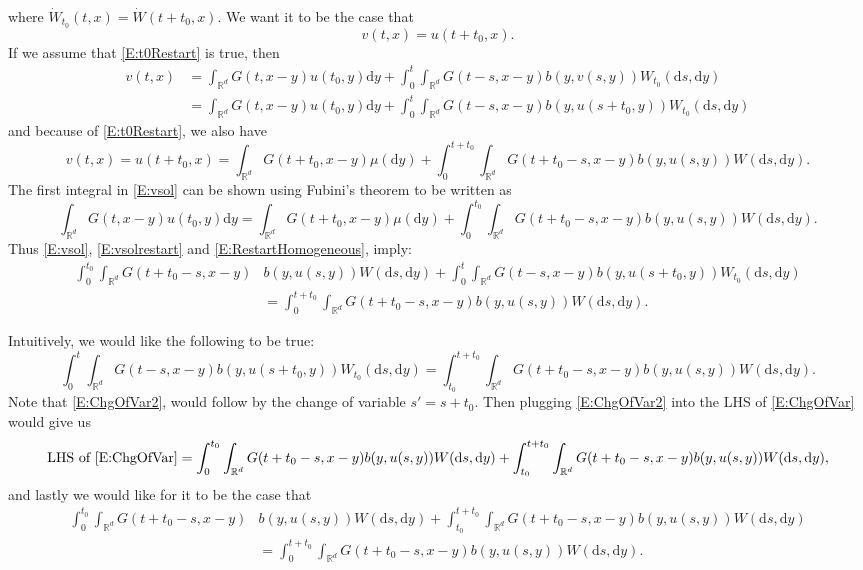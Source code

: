 \documentclass{article}
\numberwithin{equation}{section}
\newcommand{\R}{\mathbb{R}}
\newcommand{\ud}{\ensuremath{\mathrm{d}}}
\begin{document}
where $\dot{W}_{t_0}(t,x) = \dot{W}(t+t_0,x)$. We want it to be the case that
	\begin{equation} \label{E:t0Restart}
		v(t,x) = u(t+t_0,x).
	\end{equation}
If we assume that \eqref{E:t0Restart} is true, then
	\begin{align}
		v(t,x) &= \int_{\R^d} G(t,x-y) u(t_0,y) \ud y + \int_0^t \int_{\R^d} G(t-s,x-y) b(y,v(s,y)) W_{t_0}(\ud s, \ud y) \nonumber \\
		&= \int_{\R^d} G(t,x-y) u(t_0,y) \ud y + \int_0^t \int_{\R^d} G(t-s,x-y) b(y,u(s+t_0,y)) W_{t_0}(\ud s, \ud y) \label{E:vsol}
	\end{align}
and because of \eqref{E:t0Restart}, we also have
	\begin{equation}
	\label{E:vsolrestart}
		v(t,x) = u(t+t_0,x) = \int_{\R^d} G(t+t_0,x-y) \mu(\ud y) + \int_0^{t+t_0} \int_{\R^d} G(t+t_0-s,x-y) b(y,u(s,y)) W(\ud s, \ud y).
	\end{equation}
The first integral in \eqref{E:vsol} can be shown using Fubini's theorem to be written as
	\begin{equation} \label{E:RestartHomogeneous}
		\int_{\R^d} G(t,x-y) u(t_0,y) \ud y = \int_{\R^d} G(t+t_0,x-y) \mu(\ud y) + \int_0^{t_0}\int_{\R^d} G(t+t_0-s, x-y)b(y,u(s,y)) W(\ud s, \ud y).
	\end{equation}
Thus \eqref{E:vsol}, \eqref{E:vsolrestart} and \eqref{E:RestartHomogeneous}, imply:
	\begin{align}
		\int_0^{t_0}\int_{\R^d} G(t+t_0-s, x-y) & b(y,u(s,y)) W(\ud s, \ud y) + \int_0^t \int_{\R^d} G(t-s,x-y) b(y,u(s+t_0,y)) W_{t_0}(\ud s, \ud y) \nonumber \\
		&  = \int_0^{t+t_0}\int_{\R^d} G(t+t_0-s, x-y)b(y,u(s,y)) W(\ud s, \ud y) \label{E:ChgOfVar}.
	\end{align}

Intuitively, we would like the following to be true:
	\begin{equation} \label{E:ChgOfVar2}
		\int_0^t \int_{\R^d} G(t-s,x-y) b(y,u(s+t_0,y)) W_{t_0}(\ud s, \ud y) = \int_{t_0}^{t + t_0} \int_{\R^d} G(t + t_0-s,x-y) b(y,u(s,y)) W(\ud s, \ud y).
	\end{equation}
Note that \eqref{E:ChgOfVar2}, would follow by the change of variable $s' = s + t_0$. Then plugging \eqref{E:ChgOfVar2} into the LHS of \eqref{E:ChgOfVar} would give us
	\begin{align*}
		\text{LHS of }\eqref{E:ChgOfVar} = \int_0^{t_0} \int_{\R^d} G(t+t_0-s, x-y) b(y,u(s,y)) W(\ud s, \ud y) + \int_{t_0}^{t+t_0} \int_{\R^d} G(t + t_0-s,x-y) b(y,u(s,y)) W(\ud s, \ud y),
	\end{align*}
and lastly we would like for it to be the case that
	\begin{align}
		\int_0^{t_0} \int_{\R^d} G(t+t_0-s, x-y) & b(y,u(s,y)) W(\ud s, \ud y) + \int_{t_0}^{t+t_0} \int_{\R^d} G(t + t_0-s,x-y) b(y,u(s,y)) W(\ud s, \ud y) \nonumber \\
		&= \int_{0}^{t+t_0} \int_{\R^d} G(t + t_0-s,x-y) b(y,u(s,y)) W(\ud s, \ud y) \label{E:SumOfInt}.
	\end{align}
\end{document}
